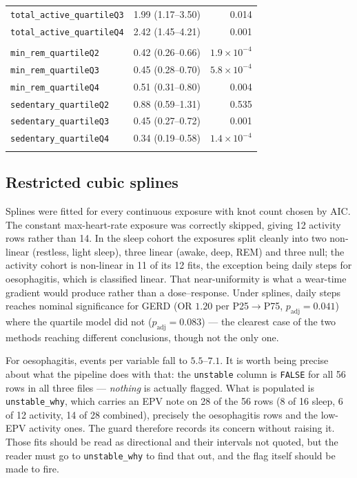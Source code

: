 \documentclass[11pt]{article}
\newcommand{\code}[1]{\texttt{\small #1}}
\begin{document}
\begin{longtable}{@{}p{5.6cm}p{4.2cm}r@{}}
\quad \code{total\_active\_quartileQ3} & 1.99 (1.17--3.50) & 0.014 \\
\quad \code{total\_active\_quartileQ4} & 2.42 (1.45--4.21) & 0.001 \\
\addlinespace
\multicolumn{3}{@{}l@{}}{\itshape min\_rem\_quartile + sedentary\_quartile} \\
\quad \code{min\_rem\_quartileQ2} & 0.42 (0.26--0.66) & $1.9\times10^{-4}$ \\
\quad \code{min\_rem\_quartileQ3} & 0.45 (0.28--0.70) & $5.8\times10^{-4}$ \\
\quad \code{min\_rem\_quartileQ4} & 0.51 (0.31--0.80) & 0.004 \\
\quad \code{sedentary\_quartileQ2} & 0.88 (0.59--1.31) & 0.535 \\
\quad \code{sedentary\_quartileQ3} & 0.45 (0.27--0.72) & 0.001 \\
\quad \code{sedentary\_quartileQ4} & 0.34 (0.19--0.58) & $1.4\times10^{-4}$ \\
\addlinespace
\bottomrule \end{longtable}

\subsection{Restricted cubic splines}
\label{sec:res-spline}
Splines were fitted for every continuous exposure with knot count chosen by AIC. The constant
max-heart-rate exposure was correctly skipped, giving 12 activity rows rather than 14. In the sleep
cohort the exposures split cleanly into two non-linear (restless, light sleep), three linear
(awake, deep, REM) and three null; the activity cohort is non-linear in 11 of its 12 fits, the
exception being daily steps for oesophagitis, which is classified linear. That near-uniformity is
what a wear-time gradient would produce rather than a dose--response. Under splines, daily steps
reaches nominal significance for GERD (OR $1.20$ per P25$\to$P75, $p_{\text{adj}}=0.041$) where
the quartile model did not ($p_{\text{adj}}=0.083$) --- the clearest case of the two methods
reaching different conclusions, though not the only one.

For oesophagitis, events per variable fall to $5.5$--$7.1$. It is worth being precise about what
the pipeline does with that: the \code{unstable} column is \code{FALSE} for all 56 rows in all
three files --- \emph{nothing} is actually flagged. What is populated is \code{unstable_why},
which carries an EPV note on 28 of the 56 rows (8 of 16 sleep, 6 of 12 activity, 14 of 28
combined), precisely the oesophagitis rows and the low-EPV activity ones. The guard therefore
records its concern without raising it. Those fits should be read as directional and their
intervals not quoted, but the reader must go to \code{unstable_why} to find that out, and the
flag itself should be made to fire.
\end{document}
